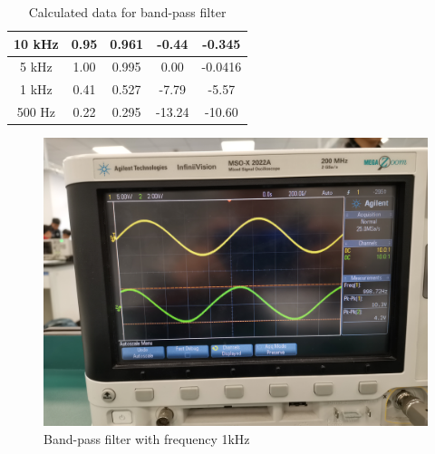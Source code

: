 \documentclass{article}
\begin{document}
\begin{table}[H]
\begin{tabular}{|c|c|c|c|c|}
10 kHz    & 0.95                                                                      & 0.961                                                                                 & -0.44                                                                                & -0.345                                                                                          \\ \hline
5 kHz     & 1.00                                                                      & 0.995                                                                                 & 0.00                                                                                 & -0.0416                                                                                         \\ \hline
1 kHz     & 0.41                                                                      & 0.527                                                                                 & -7.79                                                                                & -5.57                                                                                           \\ \hline
500 Hz    & 0.22                                                                      & 0.295                                                                                 & -13.24                                                                               & -10.60                                                                                          \\ \hline
\end{tabular}
\caption{Calculated data for band-pass filter}
\end{table}

  \begin{figure}[H]
  \centering
  \includegraphics[width=.6\textwidth]{Figure11.jpg}
  \caption{Band-pass filter with frequency 1kHz}
  \label{img} 
\end{figure}
\end{document}
